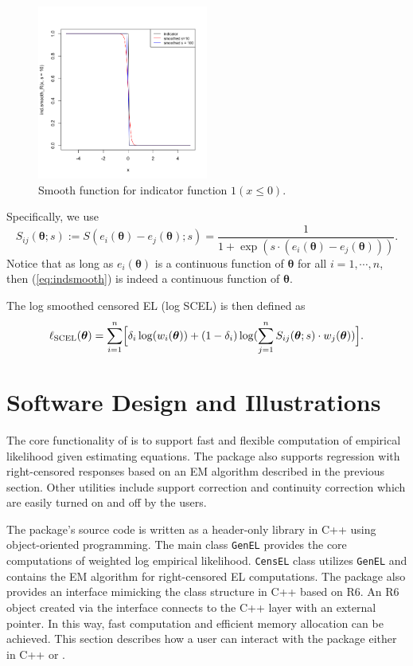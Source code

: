 \documentclass[article]{jss}
\newcommand{\tth}{\bm \theta}
\newcommand{\SCEL}{\textrm{SCEL}}
\renewcommand{\|}{\,|\,}
\begin{document}
\begin{figure}[hbt!]
\centering
\includegraphics[width=0.5\textwidth]{smoothfun.png}
\caption{Smooth function for indicator function $\mathfrak 1(x\leq 0)$.}
\label{fig:smoothfun}
\end{figure}

Specifically, we use
\begin{equation}\label{eq:indsmooth}
  S_{ij}(\tth;s) := S(e_i(\tth)-e_j(\tth);s)
  = \frac{1}{1+\exp(s\cdot(e_i(\tth)-e_j(\tth)))}.
\end{equation}
Notice that as long as \(e_i(\tth)\) is a continuous function of \(\tth\) for all \(i=1,\cdots,n\), then (\ref{eq:indsmooth}) is indeed a continuous function of \(\tth\).

The log smoothed censored EL (log SCEL) is then defined as
\begin{equation}\label{eq:logel_smoo}
  \ell_{\SCEL}(\tth) = \sum_{i=1}^n \Bigl[\delta_i\log(w_i(\tth)) +
    (1-\delta_i)\log(\sum_{j=1}^n S_{ij}(\tth;s)\cdot w_j(\tth))\Bigr].
\end{equation}

\hypertarget{software-design-and-illustrations}{%
\section{Software Design and Illustrations}\label{software-design-and-illustrations}}

The core functionality of  is to support fast and flexible computation of empirical likelihood given estimating equations. The package also supports regression with right-censored responses based on an EM algorithm described in the previous section. Other utilities include support correction and continuity correction which are easily turned on and off by the users.

The package's source code is written as a header-only library in C++ using object-oriented programming. The main class \texttt{GenEL} provides the core computations of weighted log empirical likelihood. \texttt{CensEL} class utilizes \texttt{GenEL} and contains the EM algorithm for right-censored EL computations. The package also provides an  interface mimicking the class structure in C++ based on R6. An R6 object created via the  interface connects to the C++ layer with an external pointer. In this way, fast computation and efficient memory allocation can be achieved. This section describes how a user can interact with the package either in C++ or .
\end{document}
